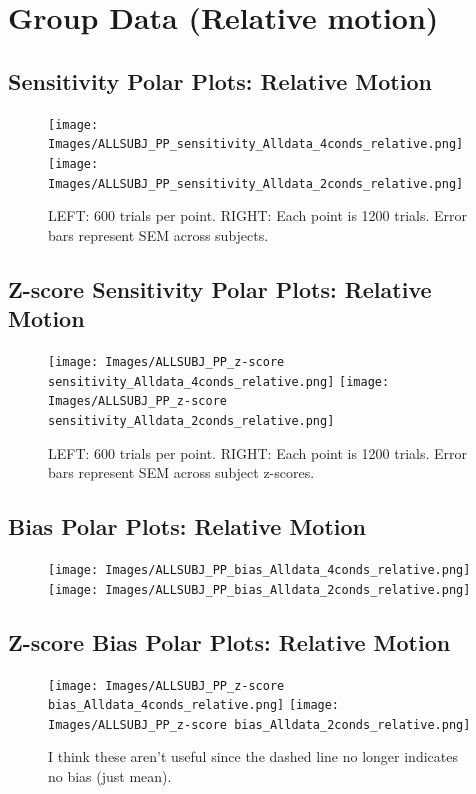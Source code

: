 \documentclass[11pt]{article} %
\begin{document}
\newpage
\section{Group Data (Relative motion)}
\subsection{Sensitivity Polar Plots: Relative Motion}
\begin{figure}[H]
\centering %
\texttt{[image: Images/ALLSUBJ\_PP\_sensitivity\_Alldata\_4conds\_relative.png]}
\texttt{[image: Images/ALLSUBJ\_PP\_sensitivity\_Alldata\_2conds\_relative.png]}
\caption{LEFT: 600 trials per point. RIGHT: Each point is 1200 trials. Error bars represent SEM across subjects.}
\end{figure}
\subsection{Z-score Sensitivity Polar Plots: Relative Motion}
\begin{figure}[H]
\centering %
\texttt{[image: Images/ALLSUBJ\_PP\_z-score sensitivity\_Alldata\_4conds\_relative.png]}
\texttt{[image: Images/ALLSUBJ\_PP\_z-score sensitivity\_Alldata\_2conds\_relative.png]}
\caption{LEFT: 600 trials per point. RIGHT: Each point is 1200 trials. Error bars represent SEM across subject z-scores.}
\end{figure}
\subsection{Bias Polar Plots: Relative Motion}
\begin{figure}[H]
\centering %
\texttt{[image: Images/ALLSUBJ\_PP\_bias\_Alldata\_4conds\_relative.png]}
\texttt{[image: Images/ALLSUBJ\_PP\_bias\_Alldata\_2conds\_relative.png]}
\end{figure}
\subsection{Z-score Bias Polar Plots: Relative Motion}
\begin{figure}[H]
\centering %
\texttt{[image: Images/ALLSUBJ\_PP\_z-score bias\_Alldata\_4conds\_relative.png]}
\texttt{[image: Images/ALLSUBJ\_PP\_z-score bias\_Alldata\_2conds\_relative.png]}
\caption{I think these aren't useful since the dashed line no longer indicates no bias (just mean).}
\end{figure}
\end{document}
